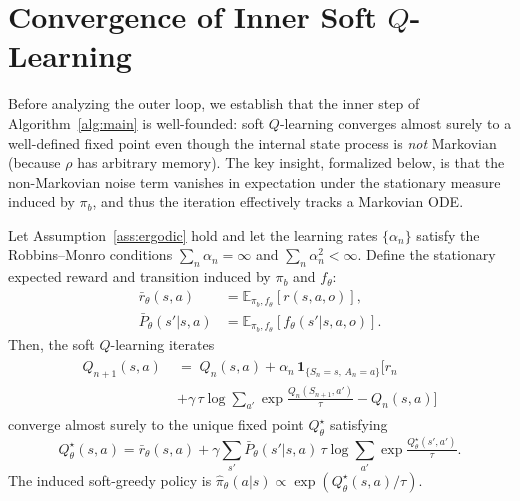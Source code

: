 \documentclass[12pt]{article}
\renewcommand{\[}{\left[}
\renewcommand{\]}{\right]}
\renewcommand{\(}{\left(}
\renewcommand{\)}{\right)}
\newcounter{l1}
\newcounter{l2}
\newcounter{l3}
\begin{document}
\section{Convergence of Inner Soft $Q$-Learning}
\label{sec:inner}

Before analyzing the outer loop, we establish that the inner step of
Algorithm~\ref{alg:main} is well-founded: soft $Q$-learning converges almost surely
to a well-defined fixed point even though the internal state process is
\emph{not} Markovian (because $\rho$ has arbitrary memory).
The key insight, formalized below, is that the non-Markovian noise term vanishes in
expectation under the stationary measure induced by $\pi_b$, and thus the iteration
effectively tracks a Markovian ODE.

\begin{theorem}
\label{thm:softq_convergence}
Let Assumption~\ref{ass:ergodic} hold and let the learning
rates $\{\alpha_n\}$ satisfy the Robbins--Monro conditions
$\sum_n \alpha_n = \infty$ and $\sum_n \alpha_n^2 < \infty$.
Define the stationary expected reward and transition induced by $\pi_b$ and $f_\theta$:
\begin{align}
  \bar{r}_\theta(s,a)
  &= \mathbb{E}_{\pi_b, f_\theta}\!\left[r(s,a,o)\right],
  \label{eq:rbar}\\
  \bar{P}_\theta(s'|s,a)
  &= \mathbb{E}_{\pi_b, f_\theta}\!\left[f_\theta(s'|s,a,o)\right].
  \label{eq:Pbar}
\end{align}
Then, the soft $Q$-learning iterates
\begin{align}\label{eq:softq_update}
\begin{split}
  Q_{n+1}(s,a)
  \;&=\; Q_n(s,a)
    + \alpha_n\, \mathbf{1}_{\{S_n=s,\,A_n=a\}}
    \!\Big[r_n\\
      &+ \gamma\,\tau\log\!\sum_{a'}\exp\!\tfrac{Q_n(S_{n+1},a')}{\tau}
      - Q_n(s,a)\Big]
\end{split}
\end{align}
converge almost surely to the unique fixed point $Q^\star_\theta$ satisfying
\begin{equation}\label{eq:soft_bellman}
  Q^\star_\theta(s,a)
  = \bar{r}_\theta(s,a)
    + \gamma\sum_{s'}\bar{P}_\theta(s'|s,a)\,
      \tau\log\!\sum_{a'}\exp\!\tfrac{Q^\star_\theta(s',a')}{\tau}.
\end{equation}
The induced soft-greedy policy is
$\widehat\pi_\theta(a|s) \propto \exp(Q^\star_\theta(s,a)/\tau)$.
\end{theorem}
\end{document}
